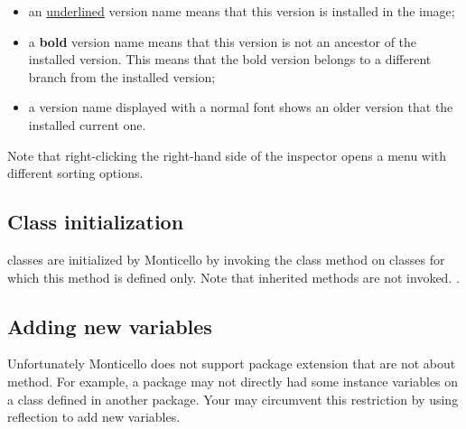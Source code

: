\documentclass[a4paper,10pt,twoside]{book}
\begin{document}
\begin{itemize}
\item an \underline{underlined} version name means that this version is installed in the image;
\item a {\bf bold} version name means that this version is not an ancestor of the installed version. This means that the bold version belongs to a different branch from the installed version;
\item a version name displayed with a normal font shows an older version that the installed current one.
\end{itemize}

\noindent
Note that right-clicking the right-hand side of the inspector opens a menu with different sorting options.


\subsection{Class initialization}

 classes are initialized by Monticello by invoking the  class method on classes for which this method is defined only. Note that inherited  methods are not invoked.
.

\subsection{Adding new variables}

Unfortunately Monticello does not support package extension that are not about method. For example, a package may not directly had some instance variables on a class defined in another package. Your may circumvent this restriction by using reflection to add new variables. 
\end{document}
